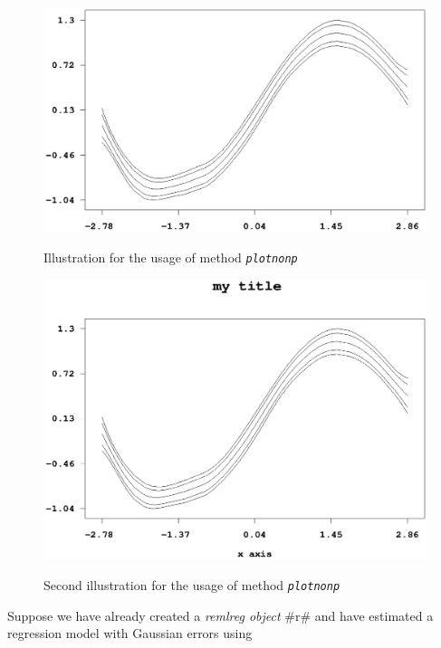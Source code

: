 \begin{figure}[ht]
\begin{center}
\includegraphics[scale=0.8]{grafiken/remlregplotnonpexample.ps}
{\em\caption{ \label{remlregplotnonpexample1} Illustration for the
usage of method \em\texttt{plotnonp}}}
\end{center}
\end{figure}


\begin{figure}[ht]
\begin{center}
\includegraphics[scale=0.8]{grafiken/remlregplotnonpexample2.ps}
{\em \caption{ \label{remlregplotnonpexample2} Second illustration
for the usage of method \em\texttt{plotnonp}}}
\end{center}
\end{figure}

Suppose we have already created a {\em remlreg object} #r# and
have estimated a regression model with Gaussian errors using

